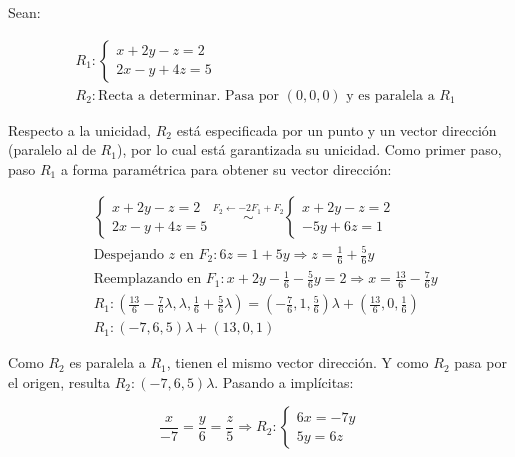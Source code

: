 \documentclass{article}
\begin{document}
Sean:

\begin{subequations}
\begin{align}
& R_1: \left\{ \begin{array}{ll}
x + 2y - z = 2 \\
2x - y + 4z = 5
\end{array} \right. \\
& R_2: \text{Recta a determinar. Pasa por } (0, 0, 0) \text{ y es paralela a } R_1
\end{align}
\end{subequations}

Respecto a la unicidad, $R_2$ está especificada por un punto y un vector dirección (paralelo al de $R_1$), por lo cual está garantizada su unicidad. Como primer paso, paso $R_1$ a forma paramétrica para obtener su vector dirección:

\begin{subequations}
\begin{align}
& \left\{ \begin{array}{l}
x + 2y -z = 2 \\
2x - y + 4z =5
\end{array} \right. \overset{F_2 \leftarrow -2F_1 + F_2}{\sim} \left\{ \begin{array}{rr}
x + 2y - z = 2 \\
-5y + 6z = 1
\end{array} \right. \\
& \text{Despejando } z \text{ en } F_2: 6z = 1 + 5y \Rightarrow z = \frac{1}{6} + \frac{5}{6} y \\
& \text{Reemplazando en } F_1: x + 2y - \frac{1}{6} -\frac{5}{6} y = 2 \Rightarrow x = \frac{13}{6} - \frac{7}{6} y \\
& R_1 : \left(\frac{13}{6} - \frac{7}{6} \lambda, \lambda, \frac{1}{6} + \frac{5}{6} \lambda \right) = \left(-\frac{7}{6}, 1, \frac{5}{6}\right) \lambda + \left(\frac{13}{6}, 0, \frac{1}{6}\right) \\
& R_1: (-7, 6, 5) \lambda + (13, 0, 1)
\end{align}
\end{subequations}

Como $R_2$ es paralela a $R_1$, tienen el mismo vector dirección. Y como $R_2$ pasa por el origen, resulta $R_2: (-7, 6, 5) \lambda $. Pasando a implícitas:

\begin{equation}
\frac{x}{-7} = \frac{y}{6} = \frac{z}{5} \Rightarrow R_2: \left\{ \begin{array}{ll}
6x = -7y \\
5y = 6z
\end{array} \right.
\end{equation}
\end{document}
